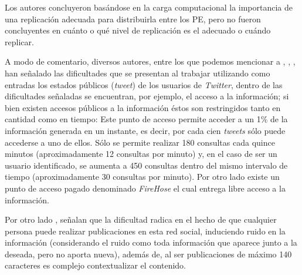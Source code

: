 Los autores concluyeron basándose en la carga computacional la importancia de una replicación adecuada para distribuirla entre los PE, pero no fueron concluyentes en cuánto o qué nivel de replicación es el adecuado o cuándo replicar.

A modo de comentario, diversos autores, entre los que podemos mencionar a \cite{VanDeVoort}, \cite{EventDetectionInTwitter}, \cite{Maldonado}, han señalado las dificultades que se presentan al trabajar utilizando como entradas los estados públicos (\textit{tweet}) de los usuarios de \textit{Twitter}, dentro de las dificultades señaladas se encuentran, por ejemplo, el acceso a la información; si bien existen accesos públicos a la información éstos son restringidos tanto en cantidad como en tiempo: Este punto de acceso permite acceder a un 1\% de la información generada en un instante, es decir, por cada cien \textit{tweets} sólo puede accederse a uno de ellos. Sólo se permite realizar 180 consultas cada quince minutos (aproximadamente 12 consultas por minuto) y, en el caso de ser un usuario identificado, se aumenta a 450 consultas dentro del mismo intervalo de tiempo (aproximadamente 30 consultas por minuto). Por otro lado existe un punto de acceso pagado denominado \textit{FireHose} el cual entrega libre acceso a la información.

Por otro lado \cite{VanDeVoort}, señalan que la dificultad radica en el hecho de que cualquier persona puede realizar publicaciones en esta red social, induciendo ruido en la información (considerando el ruido como toda información que aparece junto a la deseada, pero no aporta nueva), además de, al ser publicaciones de máximo 140 caracteres es complejo contextualizar el contenido.
